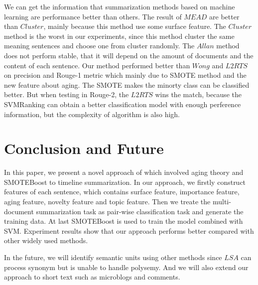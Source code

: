 \documentclass{acm_proc_article-sp}
\begin{document}
We can get the information that summarization methods based on machine learning are performance better than others. The result of $MEAD$ are better than $Cluster$, mainly because this method use some surface feature. The $Cluster$ method is the worst in our experiments, since this method cluster the same meaning sentences and choose one from cluster randomly. The $Allan$ method does not perform stable, that it will depend on the amount of documents and the content of each sentence. Our method performed better than $Wong$ and $L2RTS$ on precision and Rouge-1 metric which mainly due to  SMOTE method and the new feature about aging. The SMOTE makes the minorty class can be classified better. But when testing in Rouge-2, the $L2RTS$ wins the match, because the SVMRanking can obtain a better classification model with enough perference information, but the complexity of algorithm is also high.

%
\section{Conclusion and Future}
%

In this paper, we present a novel approach of which involved aging theory and SMOTEBoost to timeline summarization. In our approach, we firstly construct features of each sentence, which contains surface feature, importance feature, aging feature, novelty feature and topic feature. Then we treate the multi-document summarization task as pair-wise classification task and generate the training data. At last SMOTEBoost is used to train the model combined with SVM. Experiment results show that our approach performs better compared with other widely used methods.

In the future, we will identify semantic units using other methods since $LSA$ can process synonym but is unable to handle polysemy. And we will also extend our approach to short text such as microblogs and comments.




%


\end{document}
